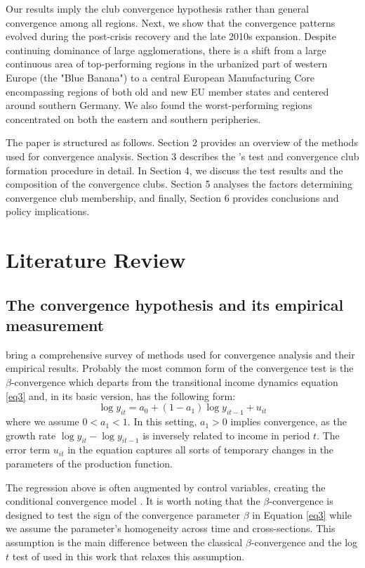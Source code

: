 \documentclass[11pt]{article}
\begin{document}
Our results imply the club convergence hypothesis rather than general convergence among all regions. Next, we show that the convergence patterns evolved during the post-crisis recovery and the late 2010s expansion. Despite continuing dominance of large agglomerations, there is a shift from a large continuous area of top-performing regions in the urbanized part of western Europe (the "Blue Banana") to a central European Manufacturing Core encompassing regions of both old and new EU member states and centered around southern Germany. We also found the worst-performing regions concentrated on both the eastern and southern peripheries.


The paper is structured as follows. Section 2 provides an overview of the methods used for convergence analysis. Section 3 describes the \citeauthor{phillips2007transition}'s test and convergence club formation procedure in detail. In Section 4, we discuss the test results and the composition of the convergence clubs. Section 5 analyses the factors determining convergence club membership, and finally, Section 6 provides conclusions and policy implications.  


\section{Literature Review}\label{Methodology}
\subsection{The convergence hypothesis and its empirical measurement}

\citet{eckey2007convergence} bring a comprehensive survey of methods used for convergence analysis and their empirical results. Probably the most common form of the convergence test is the $\beta$-convergence which departs from the transitional income dynamics equation \eqref{eq3} and, in its basic version, has the following form:
\begin{equation} \label{eq1}\log y_{it} = a_{0} + (1 - a_{1})\log y_{it-1} + u_{it} \end{equation}
where we assume \(0 < a_{1} < 1\). In this setting, \(a_{1} > 0 \) implies convergence, as the growth rate \(\log y_{it} - \log y_{it-1}\) is inversely related to income in period $t$. The error term $u_{it}$ in the equation captures all sorts of temporary changes in the parameters of the production function.

The regression above is often augmented by control variables, creating the conditional convergence model \citep{sala1996regional}. It is worth noting that the $\beta$-convergence is designed to test the sign of the convergence parameter $\beta$ in Equation \ref{eq3} while we assume the parameter's homogeneity across time and cross-sections. This assumption is the main difference between the classical  $\beta$-convergence and the log $t$ test of \citet{phillips2007transition} used in this work that relaxes this assumption.
\end{document}
